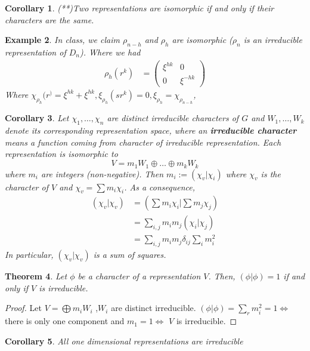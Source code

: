 \documentclass[letterpaper, leqno, 12pt]{article}
\newcommand{\fin}{\qquad \quad \hfill \framebox[1.75mm][l]{\,}}
\newcommand{\tmatrix}[4]{\left(  \begin{array}{cc}
#1 & #2 \\ 
#3 & #4
\end{array} \right) }
\theoremstyle{stdthm}
\newtheorem{thm}{Theorem}
\newtheorem{cor}[thm]{Corollary}
\theoremstyle{stddef}
\newtheorem{eg}[thm]{Example} %
\theoremstyle{stdnonum}
\theoremstyle{stdqands}
\theoremstyle{stdbold}
\begin{document}
\begin{cor}
(**)Two representations are isomorphic if and only if their characters are the same. 
\end{cor}

\begin{eg}
In class, we claim $\rho_{n-h}$ and $\rho_h$ are isomorphic ($\rho_n$ is an irreducible representation of $D_n$). Where we had
\begin{align*}
\rho_h (r^k) &= \tmatrix{\xi^{hk}}{0}{0}{\xi^{-hk}}
\end{align*}
Where $\chi_{\rho_h}(r^) = \xi^{hk} + \xi^{hk}, \xi_{\rho_h}(sr^k) = 0, \xi_{\rho_h} = \chi _{\rho_{n-h}}$, 
\end{eg}

\begin{cor}
Let $\chi_1,\dots,\chi_n$ are distinct irreducible characters of $G$ and $W_1,\dots, W_k$ denote its corresponding representation space, where an {\bf irreducible character} means a function coming from character of irreducible representation. Each representation is isomorphic to 
\[ V = m_1 W_1 \oplus \dots \oplus m_k W_k\]
where $m_i$ are integers (non-negative). Then $m_i := (\chi_v|\chi_i)$ where $\chi_v$ is the character of $V$ and $\chi_v = \sum m_i \chi_i$. As a consequence, 
\begin{align*}
(\chi_v|\chi_v) &= \left(\sum m_i \chi_i| \sum m_j \chi_j\right)\\
&= \sum_{i,j} m_i m_j (\chi_i|\chi_j)\\
&= \sum_{i,j} m_i m_j \delta_{ij} \sum_i m_i^2
\end{align*}
In particular, $(\chi_v|\chi_v)$ is a sum of squares. 
\end{cor}

\begin{thm}
Let $\phi$ be a character of a representation $V$. Then, $(\phi|\phi) = 1$ if and only if $V$ is irreducible. 
\end{thm}
\begin{proof}
Let $V = \bigoplus m_ iW_i$ ,$W_i$  are distinct irreducible.  $(\phi|\phi) = \sum_r m_i^2 = 1 \Leftrightarrow$ there is only one component and $m_1 = 1 \Leftrightarrow$ $V$ is irreducible.   
\end{proof}

\begin{cor}
All one dimensional representations are irreducible
\end{cor}
\end{document}
